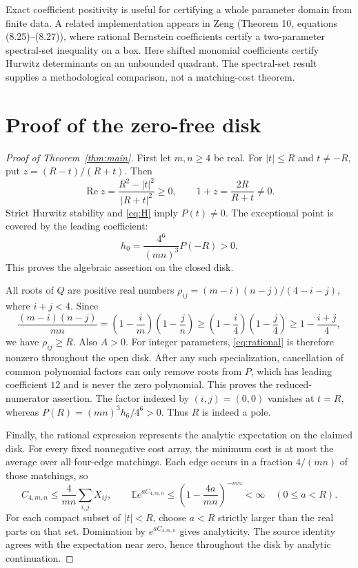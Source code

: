 \documentclass[11pt]{article}
\newcommand{\E}{\mathbb E}
\DeclareMathOperator{\Ree}{Re}
\begin{document}
Exact coefficient positivity is useful for certifying a whole parameter
domain from finite data. A related implementation appears in
Zeng \cite{zeng2026lens} (Theorem 10, equations (8.25)--(8.27)),
where rational Bernstein coefficients certify a two-parameter
spectral-set inequality on a box. Here shifted monomial coefficients
certify Hurwitz determinants on an unbounded quadrant. The
spectral-set result supplies a methodological comparison, not a
matching-cost theorem.

\section{Proof of the zero-free disk}

\begin{proof}[Proof of Theorem~\ref{thm:main}]
First let $m,n\ge4$ be real. For $|t|\le R$ and $t\neq-R$, put
$z=(R-t)/(R+t)$. Then
\[
 \Ree z=\frac{R^2-|t|^2}{|R+t|^2}\ge0,
 \qquad 1+z=\frac{2R}{R+t}\neq0.
\]
Strict Hurwitz stability and \eqref{eq:H} imply $P(t)\neq0$.
The exceptional point is covered by the leading coefficient:
\[
 h_0=\frac{4^6}{(mn)^3}P(-R)>0.
\]
This proves the algebraic assertion on the closed disk.

All roots of $Q$ are positive real numbers
$\rho_{ij}=(m-i)(n-j)/(4-i-j)$, where $i+j<4$. Since
\[
 \frac{(m-i)(n-j)}{mn}
 =\left(1-\frac{i}{m}\right)\left(1-\frac{j}{n}\right)
 \ge\left(1-\frac{i}{4}\right)\left(1-\frac{j}{4}\right)
 \ge1-\frac{i+j}{4},
\]
we have $\rho_{ij}\ge R$. Also $A>0$.
For integer parameters, \eqref{eq:rational} is therefore nonzero
throughout the open disk. After any such specialization,
cancellation of common polynomial factors can only remove roots
from $P$, which has leading coefficient $12$ and is never the zero
polynomial. This proves the reduced-numerator assertion.
The factor indexed by $(i,j)=(0,0)$ vanishes at $t=R$, whereas
$P(R)=(mn)^3h_6/4^6>0$. Thus $R$ is indeed a pole.

Finally, the rational expression represents the analytic expectation
on the claimed disk. For every fixed nonnegative cost array, the
minimum cost is at most the average over all four-edge matchings.
Each edge occurs in a fraction $4/(mn)$ of those matchings, so
\[
 C_{4,m,n}\le\frac{4}{mn}\sum_{i,j}X_{ij},\qquad
 \E e^{aC_{4,m,n}}\le
       \left(1-\frac{4a}{mn}\right)^{-mn}<\infty
       \quad(0\le a<R).
\]
For each compact subset of $|t|<R$, choose $a<R$ strictly larger
than the real parts on that set. Domination by $e^{aC_{4,m,n}}$
gives analyticity. The source identity agrees with the expectation
near zero, hence throughout the disk by analytic continuation.
\end{proof}
\end{document}
